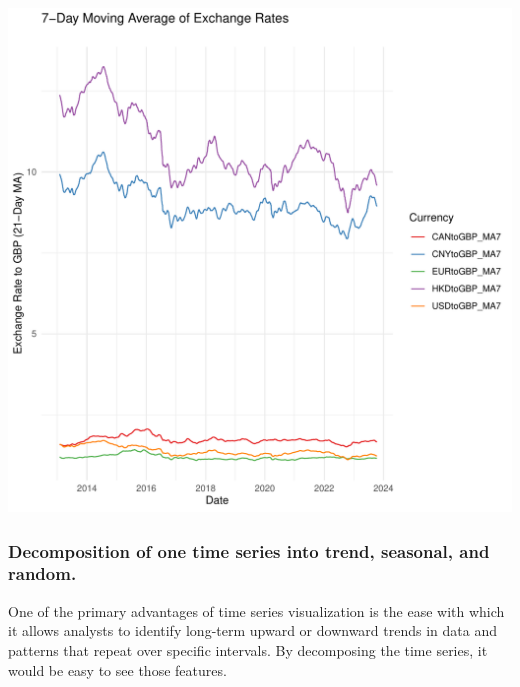 \documentclass{article}\usepackage[]{graphicx}\usepackage[]{xcolor}
\makeatletter
\def\maxwidth{ %
  \ifdim\Gin@nat@width>\linewidth
    \linewidth
  \else
    \Gin@nat@width
  \fi
}
\newenvironment{kframe}{%
 \def\at@end@of@kframe{}%
 \ifinner\ifhmode%
  \def\at@end@of@kframe{\end{minipage}}%
  \begin{minipage}{\columnwidth}%
 \fi\fi%
 \def\FrameCommand##1{\hskip\@totalleftmargin \hskip-\fboxsep
 \colorbox{shadecolor}{##1}\hskip-\fboxsep
     \hskip-\linewidth \hskip-\@totalleftmargin \hskip\columnwidth}%
 \MakeFramed {\advance\hsize-\width
   \@totalleftmargin\z@ \linewidth\hsize
   \@setminipage}}%
 {\par\unskip\endMakeFramed%
 \at@end@of@kframe}
\newenvironment{knitrout}{}{} %
\makeatother
\begin{document}
\begin{knitrout}
\begin{kframe}
{\ttfamily\noindent\color{warningcolor}{\#\# Warning: Removed 100 rows containing missing values (`geom\_line()`).}}\end{kframe}
\includegraphics[width=\maxwidth]{figure/unnamed-chunk-2-1} 
\end{knitrout}


\subsubsection{Decomposition of one time series into trend, seasonal, and random.}


One of the primary advantages of time series visualization is the ease with which it allows analysts to identify long-term upward or downward trends in data and patterns that repeat over specific intervals. By decomposing the time series, it would be easy to see those features.
\end{document}
